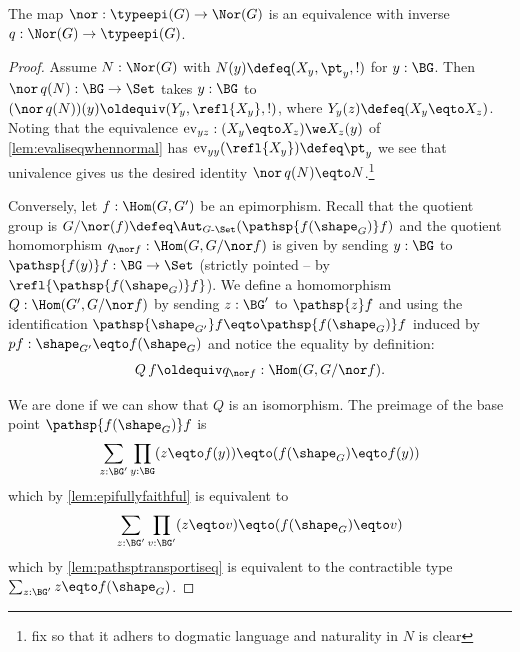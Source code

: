 \begin{lemma}
  \label{lem:qeq}
  The map $\nor:\typeepi(G)\to\Nor(G)$ is an equivalence with inverse $q:\Nor(G)\to\typeepi(G)$.
\end{lemma}
\begin{proof}
  Assume $N:\Nor(G)$ with $N(y)\defeq(X_y,\pt_y,!)$ for $y:\BG$.
  Then $\nor\, q(N):\BG\to\Set$ takes $y:\BG$ to $(\nor\, q(N))(y)\oldequiv(Y_y,\refl{X_y},!)$, where $Y_y(z)\defeq (X_y\eqto X_z)$.
  Noting that the equivalence $\mathrm{ev}_{yz}:(X_y\eqto X_z)\we X_z(y)$ of \cref{lem:evaliseqwhennormal} has $\mathrm{ev}_{yy}(\refl{X_y})\defeq \pt_y$ we see that univalence gives us the desired identity $\nor\, q(N)\eqto N$.\footnote{fix so that it adhers to dogmatic language and naturality in $N$ is clear}

  Conversely, let $f:\Hom(G,G')$ be an epimorphism.
  Recall that the quotient group is $G/\nor(f)\defeq\Aut_{G\text{-}\Set}(\pathsp{f(\sh_G)}f)$ and the quotient homomorphism $q_{\nor f}:\Hom(G,G/\nor f)$ is given by sending $y:\BG$ to $\pathsp{f(y)}f:\BG\to\Set$ (strictly pointed -- \ie by $\refl{\pathsp{f(\sh_G)}f}$).
  We define a homomorphism $Q:\Hom(G',G/\nor f)$ by sending $z:\BG'$ to $\pathsp{z}f$ and using the identification $\pathsp{\sh_{G'}}f\eqto \pathsp{f(\sh_G)}f$ induced by $pf:\sh_{G'}\eqto f(\sh_G)$ and notice the equality by definition:
  $$Q\,f\oldequiv q_{\nor f}:\Hom(G,G/\nor f).$$

We are done if we can show that $Q$ is an isomorphism.
The preimage of the base point $\pathsp{f(\sh_G)}f$ is
$$\sum_{z:\BG'}\prod_{y:\BG}(z\eqto f(y))\eqto (f(\sh_G)\eqto f(y))$$
which by
\cref{lem:epifullyfaithful} is equivalent to
$$\sum_{z:\BG'}\prod_{v:\BG'}(z\eqto v)\eqto (f(\sh_G)\eqto v)$$
which by \cref{lem:pathsptransportiseq} is equivalent to the contractible type $\sum_{z:\BG'}z\eqto f(\sh_G)$.
\end{proof}

